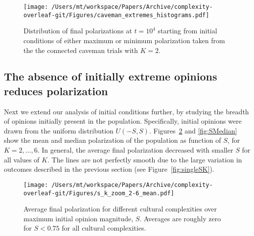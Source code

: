 \begin{figure}[H]
  \centering
    \texttt{[image: /Users/mt/workspace/Papers/Archive/complexity-overleaf-git/Figures/caveman\_extremes\_histograms.pdf]}
  \caption{Distribution of final polarizations at $t = 10^4$
    starting from initial conditions of either maximum or minimum polarization taken from the 
    the connected caveman trials with $K = 2$.
  }
  \label{fig:highpol-histogram}
\end{figure}

\subsection{The absence of initially extreme opinions reduces polarization}

Next we extend our analysis of initial conditions further, by studying the breadth of opinions initially present in the population. 
Specifically, initial opinions were drawn from the uniform distribution $U(-S, S)$. 
Figures~\ref{fig:SAverage} and \ref{fig:SMedian} show the mean and median polarization of the population as function of $S$, for $K=2,\ldots,6$. 
In general, the average final polarization decreased with smaller $S$ for all values of $K$. The lines are not perfectly smooth due to the large variation in outcomes described in the previous section (see Figure~\ref{fig:singleSK}). 


\begin{figure}[H]
  \centering
    \texttt{[image: /Users/mt/workspace/Papers/Archive/complexity-overleaf-git/Figures/s\_k\_zoom\_2-6\_mean.pdf]}
  \caption{Average final polarization for different cultural complexities over 
    maximum initial opinion magnitude, $S$. 
    Averages are roughly zero for $S<0.75$ for all cultural complexities.
  }
  \label{fig:SAverage}
\end{figure}

